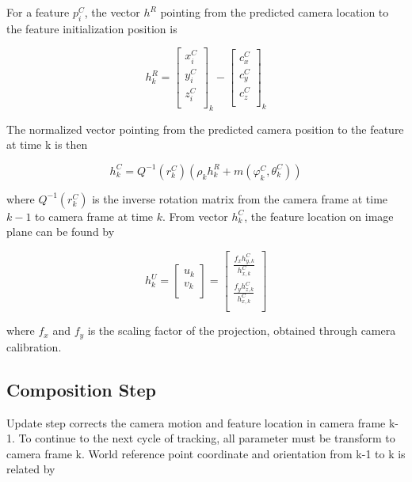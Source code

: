 For a feature $p_{i}^{C}$, the vector $h^{R}$ pointing from the 
predicted camera location to the feature initialization position is 

\begin{equation}
h_{k}^{R}=\begin{bmatrix}
x_{i}^{C} \\
y_{i}^{C} \\
z_{i}^{C} \\
\end{bmatrix}_{k}-\begin{bmatrix}
c_{x}^{C} \\
c_{y}^{C} \\
c_{z}^{C} \\
\end{bmatrix}_{k}
\end{equation}

The normalized vector pointing from the predicted camera position to the 
feature at time k is then 

\begin{equation}
  h_{k}^{C}=Q^{-1}\left(r_{k}^{C}\right)\left(\rho _{k}h_{k}^{R}+m\left(\varphi_{ 
        k}^{C},\theta _{k}^{C}\right)\right)
\end{equation}

\noindent where $Q^{-1}(r_{k}^{C})$ is the inverse rotation matrix from the 
camera frame at time $k-1$ to camera frame at time $k$. From vector 
$h_{k}^{C}$, the feature location on image plane can be found by

\begin{equation}
h_{k}^{U}= \begin{bmatrix}
u_{k} \\
v_{k} \\
\end{bmatrix}=\begin{bmatrix}
\frac{f_{x}h_{y,k}^{C}}{h_{x,k}^{C}} \\
\frac{f_{y}h_{z,k}^{C}}{h_{x,k}^{C}} \\
\end{bmatrix}
\end{equation}

\noindent where $f_{x}$ and $f_{y}$ is the scaling factor of the projection, 
obtained through camera calibration.

\subsection{Composition Step}

Update step corrects the camera motion and feature location in camera 
frame k-1. To continue to the next cycle of tracking, all parameter must 
be transform to camera frame k. World reference point coordinate and 
orientation from k-1 to k is related by

